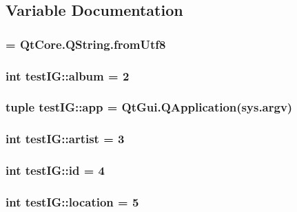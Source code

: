 \subsection{Variable Documentation}
\hypertarget{namespacetestIG_a2d98915bee32d38cdcf4b3d9ff99717b}{
\subsubsection[{\_\-fromUtf8}]{ = QtCore.QString.fromUtf8}}
\label{namespacetestIG_a2d98915bee32d38cdcf4b3d9ff99717b}
\hypertarget{namespacetestIG_afe23cfaeea66a3176b261346c34d257b}{
\subsubsection[{album}]{\setlength{\rightskip}{0pt plus 5cm}int {\bf testIG::album} = 2}}
\label{namespacetestIG_afe23cfaeea66a3176b261346c34d257b}
\hypertarget{namespacetestIG_a00d42e6b6e4421bdaec1f45a7479a99b}{
\subsubsection[{app}]{\setlength{\rightskip}{0pt plus 5cm}tuple {\bf testIG::app} = QtGui.QApplication(sys.argv)}}
\label{namespacetestIG_a00d42e6b6e4421bdaec1f45a7479a99b}
\hypertarget{namespacetestIG_ac2f48095bbe8837d1ef447d789e1cfb9}{
\subsubsection[{artist}]{\setlength{\rightskip}{0pt plus 5cm}int {\bf testIG::artist} = 3}}
\label{namespacetestIG_ac2f48095bbe8837d1ef447d789e1cfb9}
\hypertarget{namespacetestIG_a73bd609aed9cb4e7b114472458d4a231}{
\subsubsection[{id}]{\setlength{\rightskip}{0pt plus 5cm}int {\bf testIG::id} = 4}}
\label{namespacetestIG_a73bd609aed9cb4e7b114472458d4a231}
\hypertarget{namespacetestIG_a5e7314a258b3a05057454cc56cd727e3}{
\subsubsection[{location}]{\setlength{\rightskip}{0pt plus 5cm}int {\bf testIG::location} = 5}}
